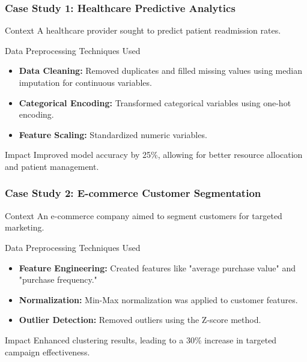 \documentclass[aspectratio=169]{beamer}
\begin{document}
\begin{frame}[fragile]
    \frametitle{Case Study 1: Healthcare Predictive Analytics}
    \begin{block}{Context}
        A healthcare provider sought to predict patient readmission rates.
    \end{block}
    \begin{block}{Data Preprocessing Techniques Used}
        \begin{itemize}
            \item \textbf{Data Cleaning:} Removed duplicates and filled missing values using median imputation for continuous variables.
            \item \textbf{Categorical Encoding:} Transformed categorical variables using one-hot encoding.
            \item \textbf{Feature Scaling:} Standardized numeric variables.
        \end{itemize}
    \end{block}
    \begin{block}{Impact}
        Improved model accuracy by 25\%, allowing for better resource allocation and patient management.
    \end{block}
\end{frame}

\begin{frame}[fragile]
    \frametitle{Case Study 2: E-commerce Customer Segmentation}
    \begin{block}{Context}
        An e-commerce company aimed to segment customers for targeted marketing.
    \end{block}
    \begin{block}{Data Preprocessing Techniques Used}
        \begin{itemize}
            \item \textbf{Feature Engineering:} Created features like "average purchase value" and "purchase frequency."
            \item \textbf{Normalization:} Min-Max normalization was applied to customer features.
            \item \textbf{Outlier Detection:} Removed outliers using the Z-score method.
        \end{itemize}
    \end{block}
    \begin{block}{Impact}
        Enhanced clustering results, leading to a 30\% increase in targeted campaign effectiveness.
    \end{block}
\end{frame}
\end{document}
